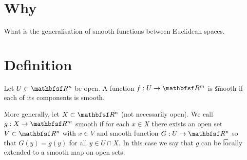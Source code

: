 

\section*{Why}

What is the generalisation of smooth functions between Euclidean spaces.

\section*{Definition}

Let $U \subset \R ^n$ be open.
A function $f: U \to \R ^m$ is \t{smooth} if each of its components is smooth.

More generally, let $X \subset \R ^n$ (not necessarily open).
We call $g: X \to \R ^m$ smooth if for each $x \in X$ there exists an open set $V \subset \R ^n$ with $x \in V$ and smooth function $G: U \to \R ^n$ so that $G(y) = g(y)$ for all $y \in U \cap  X$.
In this case we say that $g$ can be \t{locally extended} to a smooth map on open sets.

\blankpage